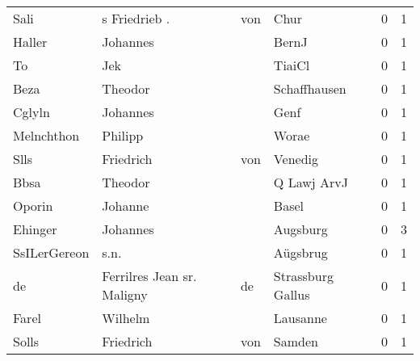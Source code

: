 \begin{center}
\begin{tiny}
\begin{longtabu}{llllrr}
                     Sali &                      s Friedrieb . &         von &                                        Chur &          0 &         1 \\
                   Haller &                           Johannes &             &                                       BernJ &          0 &         1 \\
                       To &                                Jek &             &                                      TiaiCl &          0 &         1 \\
                     Beza &                            Theodor &             &                                Schaffhausen &          0 &         1 \\
                   Cglyln &                           Johannes &             &                                        Genf &          0 &         1 \\
               Melnchthon &                            Philipp &             &                                       Worae &          0 &         1 \\
                     Slls &                          Friedrich &         von &                                     Venedig &          0 &         1 \\
                     Bbsa &                            Theodor &             &                                 Q Lawj ArvJ &          0 &         1 \\
                   Oporin &                            Johanne &             &                                       Basel &          0 &         1 \\
                  Ehinger &                           Johannes &             &                                    Augsburg &          0 &         3 \\
             SsILerGereon &                               s.n. &             &                                    Aügsbrug &          0 &         1 \\
                       de &         Ferrilres Jean sr. Maligny &          de &                           Strassburg Gallus &          0 &         1 \\
                    Farel &                            Wilhelm &             &                                    Lausanne &          0 &         1 \\
                    Solls &                          Friedrich &         von &                                      Samden &          0 &         1 \\

\end{longtabu}
\end{tiny}
\end{center}
